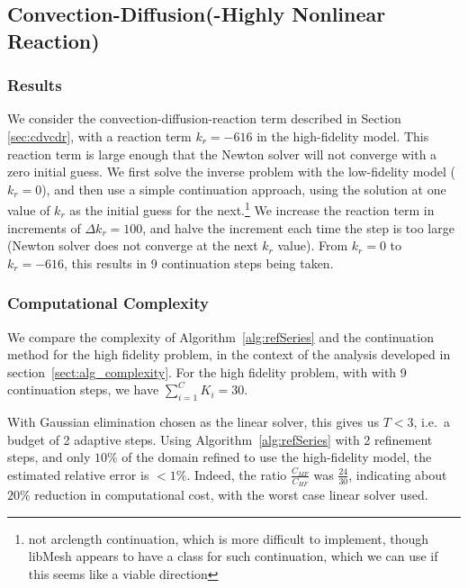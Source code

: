 %
\subsection{Convection-Diffusion(-Highly Nonlinear Reaction)}
%
%
\subsubsection{Results}
%
We consider the convection-diffusion-reaction term described in Section \ref{sec:cdvcdr}, with a reaction term $k_r=-616$ in the high-fidelity model. This reaction term is large enough that the Newton solver will not converge with a zero initial guess. We first solve the inverse problem with the low-fidelity model ($k_r=0$), and then use a simple continuation approach, using the solution at one value of $k_r$ as the initial guess for the next.\footnote{not arclength continuation, which is more difficult to implement, though libMesh appears to have a class for such continuation, which we can use if this seems like a viable direction} We increase the reaction term in increments of $\Delta k_r=100$, and halve the increment each time the step is too large (Newton solver does not converge at the next $k_r$ value). From $k_r=0$ to $k_r=-616$, this results in 9 continuation steps being taken.
%
\subsubsection{Computational Complexity}
%
We compare the complexity of Algorithm~\ref{alg:refSeries} and the continuation method for the high fidelity problem, in the context of the analysis developed in section~\ref{sect:alg_complexity}. For the high fidelity problem, with  with 9 continuation steps, we have $\sum\limits_{i=1}^{C} K_i=30$. 
 
With Gaussian elimination chosen as the linear solver, this gives us $T < 3$, i.e.\ a budget of 2 adaptive steps. Using Algorithm~\ref{alg:refSeries} with 2 refinement steps, and only $10\%$ of the domain refined to use the high-fidelity model, the estimated relative error is $<1\%$. Indeed, the ratio $\frac{C_{MF}}{C_{HF}}$ was $\frac{24}{30}$, indicating about $20\%$ reduction in computational cost, with the worst case linear solver used. 

